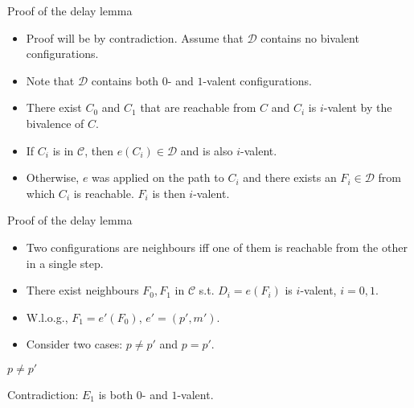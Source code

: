 \documentclass{beamer}
\begin{document}
\begin{frame}{Proof of the delay lemma}
  \begin{itemize}
    \item Proof will be by contradiction. Assume that $\mathcal{D}$ contains no bivalent configurations.
    \item Note that $\mathcal{D}$ contains both $0$- and $1$-valent configurations.
    \item There exist $C_0$ and $C_1$ that are reachable from $C$ and $C_i$ is $i$-valent by the bivalence of $C$.
    \item If $C_i$ is in $\mathcal{C}$, then $e(C_i) \in \mathcal{D}$ and is also $i$-valent.
    \item Otherwise, $e$ was applied on the path to $C_i$ and there exists an $F_i \in \mathcal{D}$ from which $C_i$ is reachable. $F_i$ is then $i$-valent.
  \end{itemize}
\end{frame}

\begin{frame}{Proof of the delay lemma}
  \begin{itemize}
    \item Two configurations are \alert{neighbours} iff one of them is reachable from the other in a single step.
    \item There exist neighbours $F_0, F_1$ in $\mathcal{C}$ s.t. $D_i = e(F_i)$ is $i$-valent, $i = 0,1$.
    \item W.l.o.g., $F_1 = e'(F_0)$, $e' = (p', m')$.
    \item Consider two cases: $p \ne p'$ and $p = p'$.
  \end{itemize}
\end{frame}

\begin{frame}{$p \ne p'$}
  \begin{figure}[!h]
  \centering
  \end{figure}
Contradiction: $E_1$ is both $0$- and $1$-valent.
\end{frame}
\end{document}
